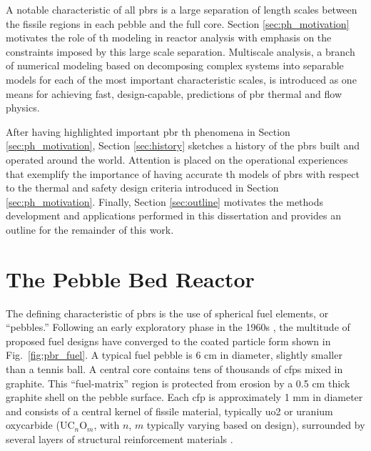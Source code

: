 A notable characteristic of all \glspl{pbr} is a large separation of length scales between the fissile regions in each pebble and the full core. Section \ref{sec:ph_motivation} motivates the role of \gls{th} modeling in reactor analysis with emphasis on the constraints imposed by this large scale separation. Multiscale analysis, a branch of numerical modeling based on decomposing complex systems into separable models for each of the most important characteristic scales, is introduced as one means for achieving fast, design-capable, predictions of \gls{pbr} thermal and flow physics.

After having highlighted important \gls{pbr} \gls{th} phenomena in Section \ref{sec:ph_motivation}, Section \ref{sec:history} sketches a history of the \glspl{pbr} built and operated around the world. Attention is placed on the operational experiences that exemplify the importance of having accurate \gls{th} models of \glspl{pbr} with respect to the thermal and safety design criteria introduced in Section \ref{sec:ph_motivation}. Finally, Section \ref{sec:outline} motivates the methods development and applications performed in this dissertation and provides an outline for the remainder of this work.

\section{The Pebble Bed Reactor}
\label{sec:pbr_concept}

The defining characteristic of \glspl{pbr} is the use of spherical fuel elements, or ``pebbles.'' Following an early exploratory phase in the 1960s \cite{claxton,hecker}, the multitude of proposed fuel designs have converged to the coated particle form shown in Fig.\ \ref{fig:pbr_fuel}. A typical fuel pebble is 6 \si{\centi\meter} in diameter, slightly smaller than a tennis ball. A central core contains tens of thousands of \glspl{cfp} mixed in graphite. This ``fuel-matrix'' region is protected from erosion by a 0.5 \si{\centi\meter} thick graphite shell on the pebble surface. Each \gls{cfp} is approximately 1 \si{\milli\meter} in diameter and consists of a central kernel of fissile material, typically \gls{uo2} or uranium oxycarbide (UC$_n$O$_m$, with \(n\), \(m\) typically varying based on design), surrounded by several layers of structural reinforcement materials \cite{demkowicz, powers}.

